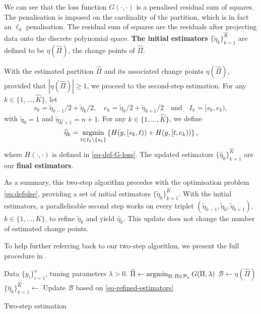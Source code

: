 \documentclass{article}
\def\argmin{\mathop{\rm argmin}}
\begin{document}
We can see that the loss function $G(\cdot, \cdot)$ is a penalised residual sum of squares.  The penalisation is imposed on the cardinality of the partition, which is in fact an $\ell_0$ penalisation.  The residual sum of squares are the residuals after projecting data onto the discrete polynomial space. 	 \textbf{The initial estimators} $\{\widetilde{\eta}_k\}_{k = 1}^{\widehat{K}}$ are defined to be $\eta(\widehat{\Pi})$, the change points of $\widehat{\Pi}$.

With the estimated partition $\widehat{\Pi}$ and its associated change points $\eta(\widehat{\Pi})$, provided that $|\eta(\widehat{\Pi})| \geq 1$, we proceed to the second-step estimation.  For any $k \in \{1, \ldots, \widehat{K}\}$, let
	\[
		s_k = \widetilde{\eta}_{k-1}/2 + \widetilde{\eta}_k/2, \quad e_k = \widetilde{\eta}_k/2 + \widetilde{\eta}_{k+1}/2 \quad \mbox{and}\quad I_k = [s_k, e_k),
	\]	
	with $\widetilde{\eta}_0 = 1$ and $\widetilde{\eta}_{\widehat{K}+1} = n+1$.  For any $k \in \{1, \ldots, \widehat{K}\}$, we define 
	\begin{equation}\label{eq-refined-estimators}
		\widehat{\eta}_k = \argmin_{t \in I_k \setminus \{s_k\}} \left\{H(y, [s_k, t)) + H(y, [t, e_k))\right\},
	\end{equation}
	where $H(\cdot, \cdot)$ is defined in \eqref{eq-def-G-loss}.  The updated estimators $\{\widehat{\eta}_k\}_{k = 1}^{\widehat{K}}$ are our \textbf{final estimators}. 
	
As a summary, this two-step algorithm precedes with the optimisation problem \eqref{eq:defplse}, providing a set of initial estimators $\{\widetilde{\eta}_k\}_{k = 1}^{\widehat{K}}$.  With the initial estimators, a parallelisable second step works on every triplet $(\widetilde{\eta}_{k-1}, \widetilde{\eta}_k, \widetilde{\eta}_{k+1})$, $k \in \{1, \ldots, K\}$, to refine $\widetilde{\eta}_k$ and yield $\widehat{\eta}_k$.  This update does not change the number of estimated change points.
	
To help further referring back to our two-step algorithm, we present the full procedure in .

\begin{algorithm}[htbp]
\begin{algorithmic}
	\INPUT Data $\{y_i\}_{i=1}^{n}$, tuning parameters $\lambda > 0$.
	\State $\widehat{\Pi} \leftarrow \argmin_{\Pi:\, \Pi \in \mathcal{P}_n} G(\Pi, \lambda)$ 
	\State $\mathcal{B} \leftarrow \eta(\widehat{\Pi})$ 
	\State
		\State $\{\widehat{\eta}_k\}_{k = 1}^{\widehat{K}} \leftarrow$ Update $\mathcal{B}$ based on \eqref{eq-refined-estimators} 
	\EndIf
\caption{Two-step estimation}
\label{algorithm:PDP}
\end{algorithmic}
\end{algorithm} 
\end{document}
